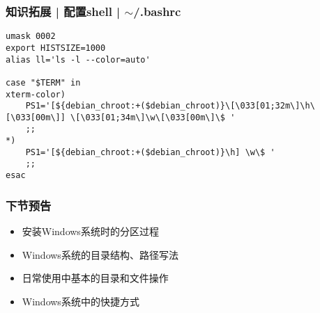 \begin{frame}[fragile]
  \frametitle{知识拓展 | 配置shell | $\sim$/.bashrc}
  \vspace{-1.5em}
\begin{lstlisting}
umask 0002
export HISTSIZE=1000
alias ll='ls -l --color=auto'

case "$TERM" in
xterm-color)
    PS1='[${debian_chroot:+($debian_chroot)}\[\033[01;32m\]\h\[\033[00m\]] \[\033[01;34m\]\w\[\033[00m\]\$ '
    ;;
*)
    PS1='[${debian_chroot:+($debian_chroot)}\h] \w\$ '
    ;;
esac
\end{lstlisting}
\end{frame}

\begin{frame}
  \frametitle{下节预告}
  \begin{itemize}
    \item 安装Windows系统时的分区过程
    \item Windows系统的目录结构、路径写法
    \item 日常使用中基本的目录和文件操作
    \item Windows系统中的快捷方式
  \end{itemize}
\end{frame}


